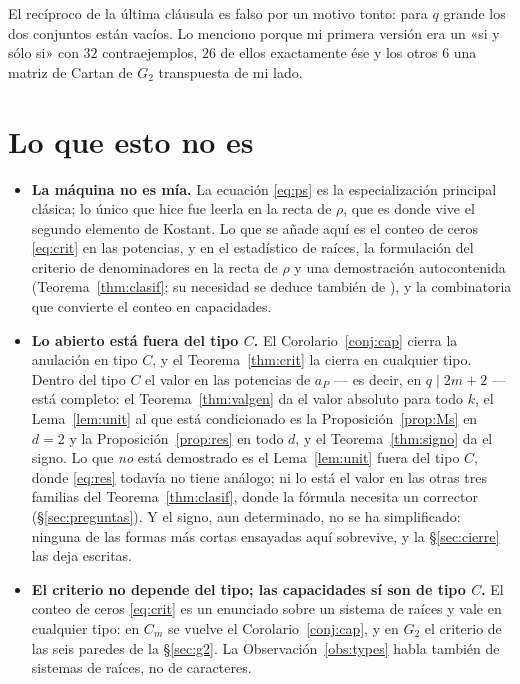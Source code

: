 \documentclass[11pt,a4paper]{article}
\begin{document}
\noindent El recíproco de la última cláusula es falso por un motivo tonto: para $q$ grande los dos
conjuntos están vacíos. Lo menciono porque mi primera versión era un «si y sólo si» con $32$
contraejemplos, $26$ de ellos exactamente ése y los otros $6$ una matriz de Cartan de $G_2$
transpuesta de mi lado.


\section{Lo que esto no es}\label{sec:open}

\begin{itemize}\itemsep2pt
\item \textbf{La máquina no es mía.} La ecuación \eqref{eq:ps} es la especialización principal
clásica; lo único que hice fue leerla en la recta de $\rho$, que es donde vive el segundo elemento de
Kostant. Lo que se añade aquí es el conteo de ceros \eqref{eq:crit} en las potencias, y en el estadístico de raíces, la formulación del criterio de denominadores en la recta de $\rho$ y una demostración autocontenida
(Teorema~\ref{thm:clasif}; su necesidad se deduce también de \cite{GS19}), y la combinatoria
que convierte el conteo en capacidades.
\item \textbf{Lo abierto está fuera del tipo $C$.} El Corolario~\ref{conj:cap} cierra la anulación
en tipo $C$, y el Teorema~\ref{thm:crit} la cierra en cualquier tipo. Dentro del tipo $C$ el valor
en las potencias de $a_P$ --- es decir, en $q\mid 2m+2$ --- está completo: el Teorema~\ref{thm:valgen} da el valor absoluto para todo $k$, el Lema~\ref{lem:unit}
al que está condicionado es la Proposición~\ref{prop:Ms} en $d=2$ y la Proposición~\ref{prop:res} en
todo $d$, y el Teorema~\ref{thm:signo} da el signo. Lo que \emph{no} está demostrado es el
Lema~\ref{lem:unit} fuera del tipo $C$, donde \eqref{eq:res} todavía no tiene análogo; ni lo está el
valor en las otras tres familias del Teorema~\ref{thm:clasif}, donde la fórmula necesita un
corrector (\S\ref{sec:preguntas}). Y el signo, aun determinado, no se ha simplificado: ninguna de
las formas más cortas ensayadas aquí sobrevive, y la \S\ref{sec:cierre} las deja escritas.
\item \textbf{El criterio no depende del tipo; las capacidades sí son de tipo $C$.} El conteo de
ceros \eqref{eq:crit} es un enunciado sobre un sistema de raíces y vale en cualquier tipo: en $C_m$
se vuelve el Corolario~\ref{conj:cap}, y en $G_2$ el criterio de las seis paredes de la \S\ref{sec:g2}. La Observación~\ref{obs:types} habla también de sistemas de raíces, no de caracteres.

\end{itemize}
\end{document}
